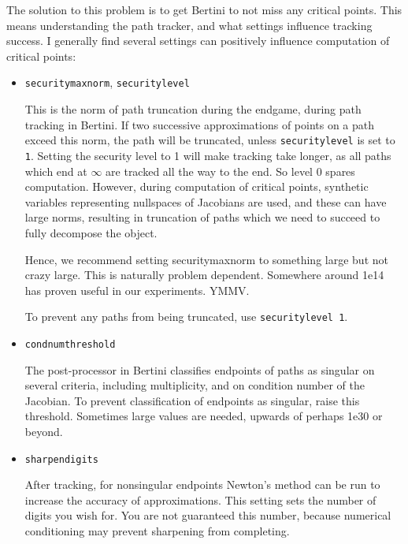 The solution to this problem is to get Bertini to not miss any critical points.  This means understanding the path tracker, and what settings influence tracking success.  I generally find several settings can positively influence computation of critical points:
\begin{itemize}
\item {\tt securitymaxnorm}, {\tt securitylevel}

 This is the norm of path truncation during the endgame, during path tracking in Bertini.  If two successive approximations of points on a path exceed this norm, the path will be truncated, unless {\tt securitylevel} is set to {\tt 1}.  Setting the security level to 1 will make tracking take longer, as all paths which end at $\infty$ are tracked all the way to the end.  So level 0 spares computation.  However, during computation of critical points, synthetic variables representing nullspaces of Jacobians are used, and these can have large norms, resulting in truncation of paths which we need to succeed to fully decompose the object.  

Hence, we recommend setting securitymaxnorm to something large but not crazy large.  This is naturally problem dependent.  Somewhere around 1e14 has proven useful in our experiments.  YMMV.

To prevent any paths from being truncated, use {\tt securitylevel 1}.

\item {\tt condnumthreshold}

The post-processor in Bertini classifies endpoints of paths as singular on several criteria, including multiplicity, and on condition number of the Jacobian.  To prevent classification of endpoints as singular, raise this threshold.  Sometimes large values are needed, upwards of perhaps 1e30 or beyond.  

\item {\tt sharpendigits}

After tracking, for nonsingular endpoints Newton's method can be run to increase the accuracy of approximations.  This setting sets the number of digits you wish for.  You are not guaranteed this number, because numerical conditioning may prevent sharpening from completing.

\end{itemize}









